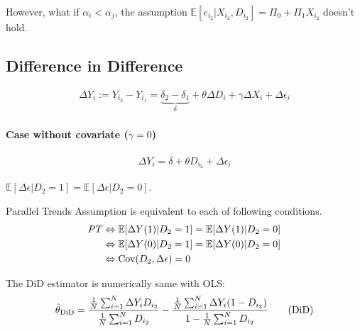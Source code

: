 \documentclass[11pt]{elegantbook}
\begin{document}
However, what if $\alpha_i<\alpha_j$, the assumption $\mathbb{E}[e_{i_2}|X_{i_2},D_{i_2}]=\Pi_0+\Pi_1 X_{i_2}$ doesn't hold.

\subsection{Difference in Difference}
\begin{equation}
    \begin{aligned}
        \Delta Y_i:=Y_{i_2}-Y_{i_1}=\underbrace{\delta_2-\delta_1}_{\delta}+\theta\Delta D_i+\gamma\Delta X_i+\Delta\epsilon_i
    \end{aligned}
    \nonumber
\end{equation}
\paragraph*{Case without covariate ($\gamma=0$)}
\begin{equation}
    \begin{aligned}
        \Delta Y_i=\delta+\theta D_{i_2}+\Delta\epsilon_i
    \end{aligned}
    \nonumber
\end{equation}

\begin{assumption}
    $\mathbb{E}[\Delta\epsilon|D_2=1]=\mathbb{E}[\Delta\epsilon|D_2=0]$.
\end{assumption}
\begin{theorem}
    Parallel Trends Assumption is equivalent to each of following conditions.
    \begin{equation}
        \begin{aligned}
            PT &\Leftrightarrow \mathbb{E}[\Delta Y(1)|D_2=1]=\mathbb{E}[\Delta Y(1)|D_2=0]\\
            &\Leftrightarrow \mathbb{E}[\Delta Y(0)|D_2=1]=\mathbb{E}[\Delta Y(0)|D_2=0]\\
            &\Leftrightarrow \textnormal{Cov}(D_2,\Delta\epsilon)=0
        \end{aligned}
        \nonumber
    \end{equation}
\end{theorem}

The DiD estimator is numerically same with OLS:
\begin{equation}
    \begin{aligned}
        \hat{\theta}_\textnormal{DiD}=\frac{\frac{1}{N}\sum_{i=1}^N\Delta Y_iD_{i_2}}{\frac{1}{N}\sum_{i=1}^N D_{i_2}}-\frac{\frac{1}{N}\sum_{i=1}^N\Delta Y_i(1-D_{i_2})}{1-\frac{1}{N}\sum_{i=1}^N D_{i_2}}
    \end{aligned}
    \tag{DiD}
    \label{DiD}
\end{equation}
\end{document}
